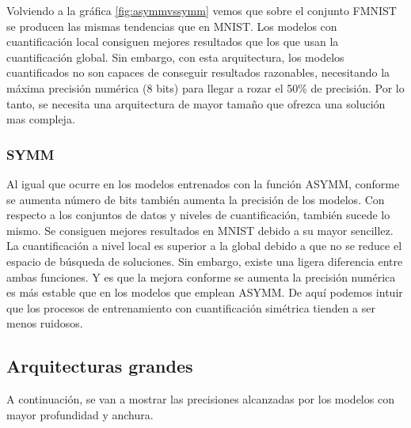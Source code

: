 Volviendo a la gráfica \ref{fig:asymmvssymm} vemos que sobre el conjunto FMNIST se producen las mismas tendencias que en MNIST. Los modelos con cuantificación local consiguen mejores resultados que los que usan la cuantificación global. Sin embargo, con esta arquitectura, los modelos cuantificados no son capaces de conseguir resultados razonables, necesitando la máxima precisión numérica (8 bits) para llegar a rozar el 50\% de precisión. Por lo tanto, se necesita una arquitectura de mayor tamaño que ofrezca una solución mas compleja.

\subsubsection{SYMM}

Al igual que ocurre en los modelos entrenados con la función ASYMM, conforme se aumenta número de bits también aumenta la precisión de los modelos. Con respecto a los conjuntos de datos y niveles de cuantificación, también sucede lo mismo. Se consiguen mejores resultados en MNIST debido a su mayor sencillez. La cuantificación a nivel local es superior a la global debido a que no se reduce el espacio de búsqueda de soluciones. Sin embargo, existe una ligera diferencia entre ambas funciones. Y es que la mejora conforme se aumenta la precisión numérica es más estable que en los modelos que emplean ASYMM. De aquí podemos intuir que los procesos de entrenamiento con cuantificación simétrica tienden a ser menos ruidosos.

\subsection{Arquitecturas grandes}
A continuación, se van a mostrar las precisiones alcanzadas por los modelos con mayor profundidad y anchura.

